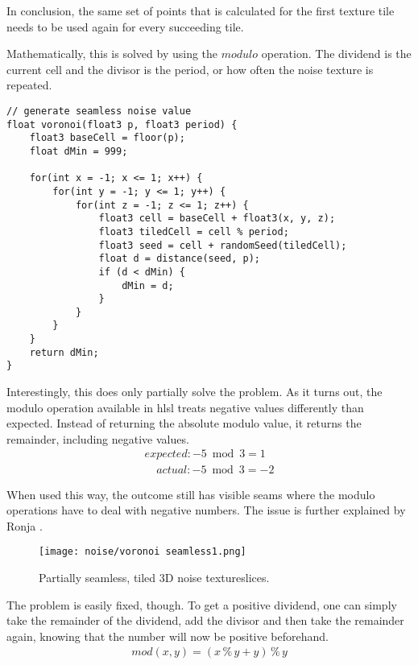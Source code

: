\noindent
In conclusion, the same set of points that is calculated for the first texture tile needs to be used again for every succeeding tile.

\pagebreak

\noindent
Mathematically, this is solved by using the $modulo$ operation. The dividend is the current cell and the divisor is the period, or how often the \gls{noise} texture is repeated.

\begin{lstlisting}[language=HLSL, caption=Implementation of a partially seamless 3D Voronoi \gls{noise} algorithm., label=lst:shader:noise:voronoi:seamless1]
// generate seamless noise value
float voronoi(float3 p, float3 period) {
    float3 baseCell = floor(p);
    float dMin = 999;

    for(int x = -1; x <= 1; x++) {
        for(int y = -1; y <= 1; y++) {
            for(int z = -1; z <= 1; z++) {
                float3 cell = baseCell + float3(x, y, z);
                float3 tiledCell = cell % period;
                float3 seed = cell + randomSeed(tiledCell);
                float d = distance(seed, p);
                if (d < dMin) {
                    dMin = d;
                }
            }
        }
    }
    return dMin;
}
\end{lstlisting}

\noindent
Interestingly, this does only partially solve the problem. As it turns out, the modulo operation available in \gls{hlsl} treats negative values differently than expected.
Instead of returning the absolute modulo value, it returns the remainder, including negative values.
$$
\begin{array}{l}
    expected: -5 \bmod 3 = 1 \\
    \phantom{ex}actual: -5 \bmod 3 = -2
\end{array}
$$

\noindent
When used this way, the outcome still has visible seams where the modulo operations have to deal with negative numbers.
The issue is further explained by Ronja \cite{ronja:tilingnoise}.

\begin{figure}[H]
    \texttt{[image: noise/voronoi seamless1.png]}
    \caption{Partially seamless, tiled 3D \gls{noise} \gls{textureslice}s.}
    \label{img:rnd:noise:seamless1}
\end{figure}

\pagebreak

\noindent
The problem is easily fixed, though. To get a positive dividend, one can simply take the remainder of the dividend, add the divisor and then take the remainder again, knowing that the number will now be positive beforehand.
$$
\begin{array}{l}
    mod(x, y) = (x \mathbin{\%} y + y) \mathbin{\%} y
\end{array}
$$

